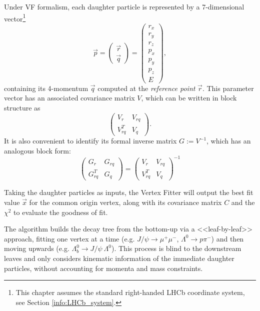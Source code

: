 Under VF formalism, each daughter particle is represented by a 7-dimensional vector\footnote{This chapter assumes the standard right-handed LHCb coordinate system, see Section \ref{info:LHCb_system}.}
\begin{equation}
	\vec{p} = \begin{pmatrix}
		\vec{r} \\ \vec{q}
	\end{pmatrix}
	=
	\begin{pmatrix}
		r_x \\ r_y \\ r_z \\ p_x \\ p_y \\ p_z \\ E
	\end{pmatrix},
	\label{eq:particle_representation}
\end{equation}
containing its 4-momentum $\vec{q}$ computed at the \textit{reference point} $\vec{r}$.
This parameter vector has an associated covariance matrix $V$, which can be written in block structure as
\begin{equation}
	\begin{pmatrix}
		V_r      & V_{rq} \\
		V_{rq}^T & V_q
	\end{pmatrix}.
	\label{eq:par_covmatrix}
\end{equation}
It is also convenient to identify its formal inverse matrix $G := V^{-1}$, which has an analogous block form:
\begin{equation}
	\begin{pmatrix}
		G_r      & G_{rq} \\
		G_{rq}^T & G_q
	\end{pmatrix}
	=
	\begin{pmatrix}
		V_r      & V_{rq} \\
		V_{rq}^T & V_q
	\end{pmatrix}^{-1}
\end{equation}

Taking the daughter particles as inputs, the Vertex Fitter will output the best fit value $\vec{x}$ for the common origin vertex, along with its covariance matrix $C$ and the $\chi^2$ to evaluate the goodness of fit.

The algorithm builds the decay tree from the bottom-up via a <<leaf-by-leaf>> approach, fitting one vertex at a time (e.g. $J/\psi \rightarrow \mu^+ \mu^-$, $\Lambda^0 \rightarrow p \pi^-$) and then moving upwards (e.g. $\Lambda_b^0 \rightarrow J/\psi~\Lambda^0$).
This process is blind to the downstream leaves and only considers kinematic information of the immediate daughter particles, without accounting for momenta and mass constraints.

